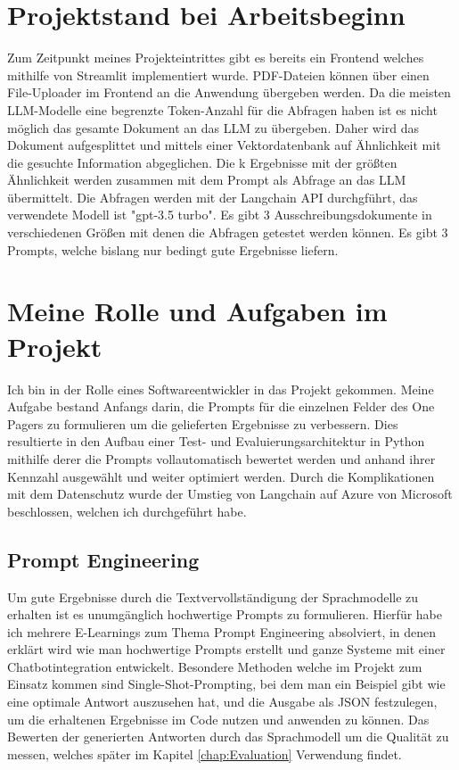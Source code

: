 \section{Projektstand bei Arbeitsbeginn}
Zum Zeitpunkt meines Projekteintrittes gibt es bereits ein Frontend welches mithilfe von Streamlit implementiert wurde. 
PDF-Dateien können über einen File-Uploader im Frontend an die Anwendung übergeben werden. Da die meisten LLM-Modelle eine 
begrenzte Token-Anzahl für die Abfragen haben ist es nicht möglich das gesamte Dokument an das LLM zu übergeben. 
Daher wird das Dokument aufgesplittet und mittels einer Vektordatenbank auf Ähnlichkeit mit die gesuchte Information 
abgeglichen. Die k Ergebnisse mit der größten Ähnlichkeit werden zusammen mit dem Prompt als Abfrage an das LLM übermittelt. 
Die Abfragen werden mit der Langchain API durchgführt, das verwendete Modell ist "gpt-3.5 turbo". Es gibt 3 Ausschreibungsdokumente 
in verschiedenen Größen mit denen die Abfragen getestet werden können. Es gibt 3 Prompts, welche bislang nur bedingt gute 
Ergebnisse liefern.

\section{Meine Rolle und Aufgaben im Projekt}
Ich bin in der Rolle eines Softwareentwickler in das Projekt gekommen. Meine Aufgabe bestand Anfangs darin, die Prompts für die einzelnen 
Felder des One Pagers zu formulieren um die gelieferten Ergebnisse zu verbessern. Dies resultierte in den Aufbau einer 
Test- und Evaluierungsarchitektur in Python mithilfe derer die Prompts vollautomatisch bewertet werden und anhand ihrer Kennzahl 
ausgewählt und weiter optimiert werden. Durch die Komplikationen mit dem Datenschutz wurde der Umstieg von Langchain auf 
Azure von Microsoft beschlossen, welchen ich durchgeführt habe. 

\subsection{Prompt Engineering}
Um gute Ergebnisse durch die Textvervollständigung der Sprachmodelle zu erhalten ist es unumgänglich hochwertige Prompts zu formulieren.
Hierfür habe ich mehrere E-Learnings zum Thema Prompt Engineering absolviert, in denen erklärt wird wie man hochwertige Prompts erstellt und 
ganze Systeme mit einer Chatbotintegration entwickelt. Besondere Methoden welche im Projekt zum Einsatz kommen sind Single-Shot-Prompting, 
bei dem man ein Beispiel gibt wie eine optimale Antwort auszusehen hat, und die Ausgabe als JSON festzulegen, um die erhaltenen Ergebnisse 
im Code nutzen und anwenden zu können. Das Bewerten der generierten Antworten durch das Sprachmodell um die Qualität zu messen, welches später 
im Kapitel \ref{chap:Evaluation} Verwendung findet.

